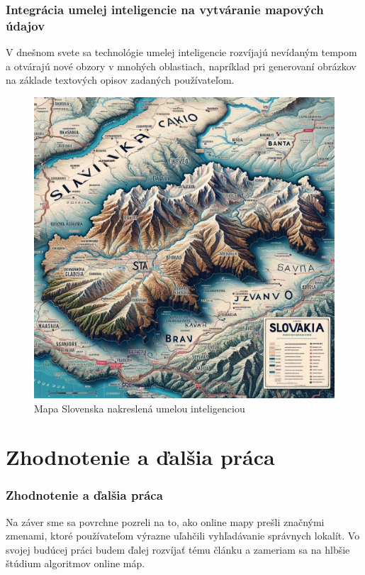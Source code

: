 \documentclass{beamer}
\begin{document}
\begin{frame}[fragile=singleslide]\frametitle{Integrácia umelej inteligencie na vytváranie mapových údajov}
V dnešnom svete sa technológie umelej inteligencie rozvíjajú nevídaným tempom a otvárajú nové obzory v mnohých oblastiach, napríklad pri generovaní obrázkov na základe textových opisov zadaných používateľom. 
	\begin{figure}[h]
		\centering
		\includegraphics[scale=0.12]{image6.png}
		\caption{Mapa Slovenska nakreslená umelou inteligenciou}
		\label{fig:ai}
	\end{figure}
\end{frame}

\section*{Zhodnotenie a ďalšia práca}

\begin{frame}[fragile=singleslide]\frametitle{Zhodnotenie a ďalšia práca}
Na záver sme sa povrchne pozreli na to, ako online mapy prešli značnými zmenami, ktoré používateľom výrazne uľahčili vyhľadávanie správnych lokalít. Vo svojej budúcej práci budem ďalej rozvíjať tému článku a zameriam sa na hlbšie štúdium algoritmov online máp. 
\end{frame}
\end{document}
